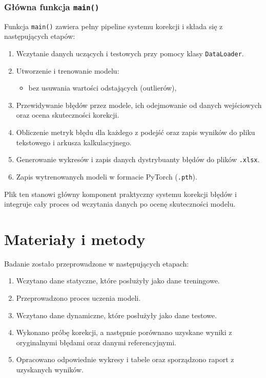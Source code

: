 \documentclass{classrep}
\begin{document}
\subsubsection*{Główna funkcja \texttt{main()}}

Funkcja \texttt{main()} zawiera pełny pipeline systemu korekcji i składa się z następujących etapów:

\begin{enumerate}
	\item Wczytanie danych uczących i testowych przy pomocy klasy \texttt{DataLoader}.

	\item Utworzenie i trenowanie modelu:
	      \begin{itemize}
		      \item bez usuwania wartości odstających (outlierów),
	      \end{itemize}

	\item Przewidywanie błędów przez modele, ich odejmowanie od danych wejściowych oraz ocena skuteczności korekcji.

	\item Obliczenie metryk błędu dla każdego z podejść oraz zapis wyników do pliku tekstowego i arkusza kalkulacyjnego.

	\item Generowanie wykresów i zapis danych dystrybuanty błędów do plików \texttt{.xlsx}.

	\item Zapis wytrenowanych modeli w formacie PyTorch (\texttt{.pth}).
\end{enumerate}

Plik ten stanowi główny komponent praktyczny systemu korekcji błędów i integruje cały proces od wczytania danych po ocenę skuteczności modelu.

\section{Materiały i metody}
Badanie zostało przeprowadzone w następujących etapach:
\begin{enumerate}
	\item Wczytano dane statyczne, które posłużyły jako dane treningowe.
	\item Przeprowadzono proces uczenia modeli.
	\item Wczytano dane dynamiczne, które posłużyły jako dane testowe.
	\item Wykonano próbę korekcji, a następnie porównano uzyskane wyniki z oryginalnymi błędami oraz danymi referencyjnymi.
	\item Opracowano odpowiednie wykresy i tabele oraz sporządzono raport z uzyskanych wyników.
\end{enumerate}
\end{document}
